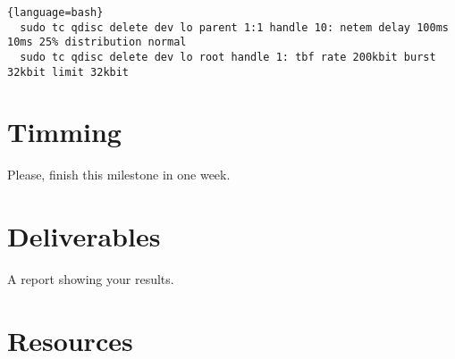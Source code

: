 \begin{lstlisting}{language=bash}
  sudo tc qdisc delete dev lo parent 1:1 handle 10: netem delay 100ms 10ms 25% distribution normal
  sudo tc qdisc delete dev lo root handle 1: tbf rate 200kbit burst 32kbit limit 32kbit
\end{lstlisting}

\section{Timming}

Please, finish this milestone in one week.

\section{Deliverables}

A report showing your results.

\section{Resources}


